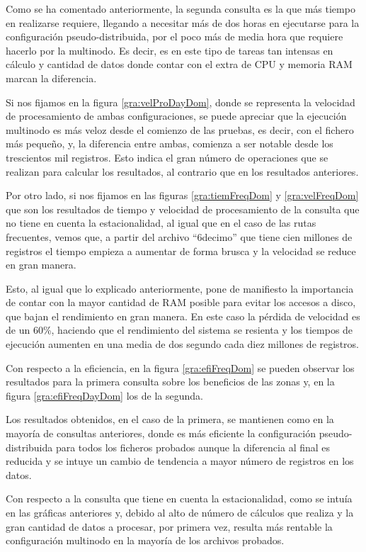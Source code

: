 Como se ha comentado anteriormente, la segunda consulta es la que más tiempo en realizarse requiere, llegando a necesitar más de dos horas en ejecutarse para la configuración pseudo-distribuida, por el poco más de media hora que requiere hacerlo por la multinodo. Es decir, es en este tipo de tareas tan intensas en cálculo y cantidad de datos donde contar con el extra de \gls{CPU} y memoria \gls{RAM} marcan la diferencia.

Si nos fijamos en la figura \ref{gra:velProDayDom}, donde se representa la velocidad de procesamiento de ambas configuraciones, se puede apreciar que la ejecución multinodo es más veloz desde el comienzo de las pruebas, es decir, con el fichero más pequeño, y, la diferencia entre ambas, comienza a ser notable desde los trescientos mil registros. Esto indica el gran número de operaciones que se realizan para calcular los resultados, al contrario que en los resultados anteriores.

Por otro lado, si nos fijamos en las figuras \ref{gra:tiemFreqDom} y \ref{gra:velFreqDom} que son los resultados de tiempo y velocidad de procesamiento de la consulta que no tiene en cuenta la estacionalidad, al igual que en el caso de las rutas frecuentes, vemos que, a partir del archivo ``6decimo'' que tiene cien millones de registros el tiempo empieza a aumentar de forma brusca y la velocidad se reduce en gran manera.

Esto, al igual que lo explicado anteriormente, pone de manifiesto la importancia de contar con la mayor cantidad de \gls{RAM} posible para evitar los accesos a disco, que bajan el rendimiento en gran manera. En este caso la pérdida de velocidad es de un 60\%, haciendo que el rendimiento del sistema se resienta y los tiempos de ejecución aumenten en una media de dos segundo cada diez millones de registros.

Con respecto a la eficiencia, en la figura \ref{gra:efiFreqDom} se pueden observar los resultados para la primera consulta sobre los beneficios de las zonas y, en la figura \ref{gra:efiFreqDayDom} los de la segunda.

Los resultados obtenidos, en el caso de la primera, se mantienen como en la mayoría de consultas anteriores, donde es más eficiente la configuración pseudo-distribuida para todos los ficheros probados aunque la diferencia al final es reducida y se intuye un cambio de tendencia a mayor número de registros en los datos.

Con respecto a la consulta que tiene en cuenta la estacionalidad, como se intuía en las gráficas anteriores y, debido al alto de número de cálculos que realiza y la gran cantidad de datos a procesar, por primera vez, resulta más rentable la configuración multinodo en la mayoría de los archivos probados.

